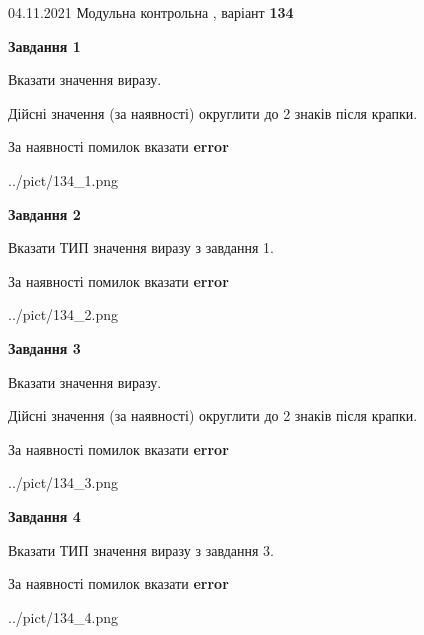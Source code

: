 \documentclass[11pt, ukrainian]{article}
\begin{document}
{04.11.2021 Модульна контрольна , варіант  \No \textbf { 134 }\par}
{
\begin {large}
{\begin {center}\textbf{Завдання 1}\end {center}}\par
Вказати значення виразу. \par
Дійсні значення (за наявності) округлити до 2 знаків після крапки. \par
За наявності помилок вказати \textbf{error}

\begin{center}
	{../pict/134_1.png}
\end{center}
\newpage

{\begin {center}\textbf{Завдання 2}\end {center}}\par
Вказати ТИП значення виразу з завдання 1. \par
За наявності помилок вказати \textbf{error}

\begin{center}
	{../pict/134_2.png}
\end{center}
\newpage

{\begin {center}\textbf{Завдання 3}\end {center}}\par
Вказати значення виразу. \par
Дійсні значення (за наявності) округлити до 2 знаків після крапки. \par
За наявності помилок вказати \textbf{error}

\begin{center}
	{../pict/134_3.png}
\end{center}
\newpage

{\begin {center}\textbf{Завдання 4}\end {center}}\par
Вказати ТИП значення виразу з завдання 3. \par
За наявності помилок вказати \textbf{error}

\begin{center}
	{../pict/134_4.png}
\end{center}
\newpage


\end{large}}
\end{document}
